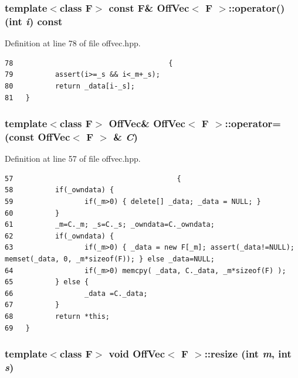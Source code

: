 \subsubsection{\setlength{\rightskip}{0pt plus 5cm}template$<$class F$>$ const F\& {\bf Off\-Vec}$<$ F $>$::operator() (int {\em i}) const\hspace{0.3cm}{\tt  [inline]}}\label{classOffVec_46442ed0ae535217a90cc5b4b63a1f44_46442ed0ae535217a90cc5b4b63a1f44}




Definition at line 78 of file offvec.hpp.

\footnotesize\begin{verbatim}78                                     {
79          assert(i>=_s && i<_m+_s);
80          return _data[i-_s]; 
81   }
\end{verbatim}\normalsize 


\subsubsection{\setlength{\rightskip}{0pt plus 5cm}template$<$class F$>$ {\bf Off\-Vec}\& {\bf Off\-Vec}$<$ F $>$::operator= (const {\bf Off\-Vec}$<$ F $>$ \& {\em C})\hspace{0.3cm}{\tt  [inline]}}\label{classOffVec_c034315db7170bb9216743a5cf94443c_c034315db7170bb9216743a5cf94443c}




Definition at line 57 of file offvec.hpp.

\footnotesize\begin{verbatim}57                                       {
58          if(_owndata) { 
59                 if(_m>0) { delete[] _data; _data = NULL; }
60          }
61          _m=C._m; _s=C._s; _owndata=C._owndata;
62          if(_owndata) {
63                 if(_m>0) { _data = new F[_m]; assert(_data!=NULL); memset(_data, 0, _m*sizeof(F)); } else _data=NULL;
64                 if(_m>0) memcpy( _data, C._data, _m*sizeof(F) );
65          } else {
66                 _data =C._data;
67          }
68          return *this;
69   }
\end{verbatim}\normalsize 


\subsubsection{\setlength{\rightskip}{0pt plus 5cm}template$<$class F$>$ void {\bf Off\-Vec}$<$ F $>$::resize (int {\em m}, int {\em s})\hspace{0.3cm}{\tt  [inline]}}\label{classOffVec_805152ec656eb1086c4cc2d5529b756f_805152ec656eb1086c4cc2d5529b756f}




